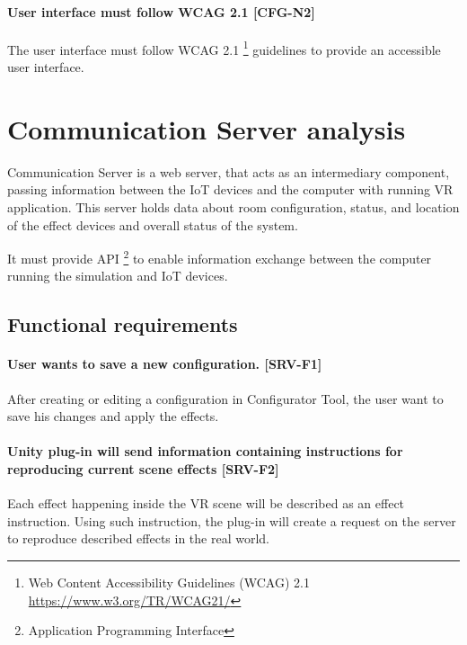 \hypertarget{x-\textbf{user-interface-must-follow-wcag-2.1}-[cfg-n2]}{\paragraph*{\textbf{User interface must follow WCAG 2.1} [CFG-N2]}}
The user interface must follow WCAG 2.1
\footnote{Web Content Accessibility Guidelines (WCAG) 2.1 \href{https://www.w3.org/TR/WCAG21/}{https://www.w3.org/TR/WCAG21/}}
guidelines to provide an accessible user interface.


\hypertarget{x-communication-server-analysis}{\section{Communication Server analysis}}
Communication Server is a web server, that acts as an intermediary component,
passing information between the IoT devices and the computer with
running VR application. This server holds data about room configuration,
status, and location of the effect devices and overall status of the system.

It must provide API \footnote{Application Programming Interface} to enable
information exchange between the computer running the simulation and IoT devices.


\subsection{Functional requirements}
\hypertarget{x-\textbf{user-wants-to-save-a-new-configuration.}-[srv-f1]}{\paragraph*{\textbf{User wants to save a new configuration.} [SRV-F1]}}
After creating or editing a configuration in Configurator Tool, the user
want to save his changes and apply the effects.


\hypertarget{x-\textbf{unity-plug-in-will-send-information-containing-instructions-for-reproducing-current-scene-effects}-[srv-f2]}{\paragraph*{\textbf{Unity plug-in will send information containing instructions for reproducing current scene effects} [SRV-F2]}}
Each effect happening inside the VR scene will be described as an effect
instruction. Using such instruction, the plug-in will create a request on the server to
reproduce described effects in the real world.


